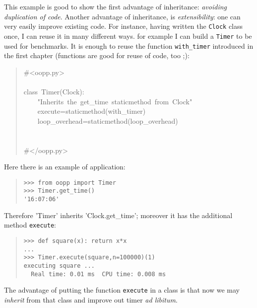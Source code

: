 \documentclass[10pt,english]{article}
\begin{document}
This example is good to show the first advantage of inheritance: 
\emph{avoiding duplication of code}.
Another advantage of inheritance, is \emph{extensibility}: one can very easily
improve existing code. For instance, having written the \texttt{Clock} class once, 
I can reuse it in many different ways. for example I can build a \texttt{Timer} 
to be used for benchmarks. It is enough to reuse the function \texttt{with{\_}timer}
introduced in the first chapter (functions are good for reuse of code, too ;):
\begin{quote}
\begin{ttfamily}\begin{flushleft}
\mbox{{\#}<oopp.py>}\\
\mbox{}\\
\mbox{class~Timer(Clock):}\\
\mbox{~~~~"Inherits~the~get{\_}time~staticmethod~from~Clock"}\\
\mbox{~~~~execute=staticmethod(with{\_}timer)}\\
\mbox{~~~~loop{\_}overhead=staticmethod(loop{\_}overhead)}\\
\mbox{}\\
\mbox{}\\
\mbox{{\#}</oopp.py>}
\end{flushleft}\end{ttfamily}
\end{quote}

Here there is an example of application:
\begin{quote}
\begin{verbatim}>>> from oopp import Timer
>>> Timer.get_time()
'16:07:06'\end{verbatim}
\end{quote}

Therefore 'Timer' inherits 'Clock.get{\_}time'; moreover it has the additional 
method \texttt{execute}:
\begin{quote}
\begin{verbatim}>>> def square(x): return x*x
...
>>> Timer.execute(square,n=100000)(1)
executing square ...
  Real time: 0.01 ms  CPU time: 0.008 ms\end{verbatim}
\end{quote}

The advantage of putting the function \texttt{execute} in a class is that
now we may \emph{inherit} from that class and improve out timer \emph{ad
libitum}.


\end{document}
